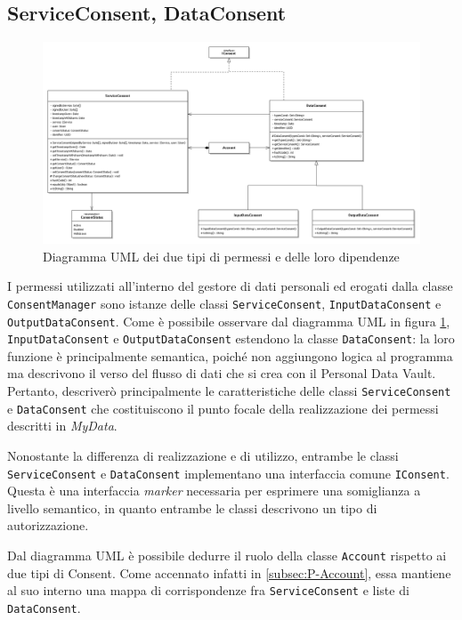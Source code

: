 \subsection{ServiceConsent, DataConsent}
\label{subsec:P-ServiceConsentDataConsent}
\begin{figure} [h]
	\includegraphics[width=\linewidth]{pictures/Auth-Consents.png}
	\caption{Diagramma UML dei due tipi di permessi e delle loro dipendenze}
	\label{fig:Auth-Consents}
\end{figure}
I permessi utilizzati all’interno del gestore di dati personali ed erogati dalla classe \texttt{ConsentManager} sono istanze delle classi \texttt{ServiceConsent}, \texttt{InputDataConsent} e \texttt{OutputDataConsent}. Come \`e possibile osservare dal diagramma UML in figura \ref{fig:Auth-Consents}, \texttt{InputDataConsent} e \texttt{OutputDataConsent} estendono la classe \texttt{DataConsent}: la loro funzione \`e principalmente semantica, poich\'e non aggiungono logica al programma ma descrivono il verso del flusso di dati che si crea con il Personal Data Vault. Pertanto, descriver\`o principalmente le caratteristiche delle classi \texttt{ServiceConsent} e \texttt{DataConsent} che costituiscono il punto focale della realizzazione dei permessi descritti in \textit{MyData}.

Nonostante la differenza di realizzazione e di utilizzo, entrambe le classi \texttt{ServiceConsent} e \texttt{DataConsent} implementano una interfaccia comune \texttt{IConsent}. Questa \`e una interfaccia \textit{marker} necessaria per esprimere una somiglianza a livello semantico, in quanto entrambe le classi descrivono un tipo di autorizzazione.

Dal diagramma UML \`e possibile dedurre il ruolo della classe \texttt{Account} rispetto ai due tipi di Consent. Come accennato infatti in \ref{subsec:P-Account}, essa mantiene al suo interno una mappa di corrispondenze fra \texttt{ServiceConsent} e liste di \texttt{DataConsent}.

